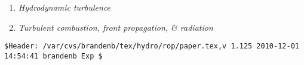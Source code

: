 \documentclass[12pt]{article}
\begin{document}
\begin{enumerate}
\begin{enumerate}
\item
{\em Hydrodynamic turbulence} \citep{
2012AN....333..195B,%
2011IAUS..274..373S,%
2011A&A...528A.145D,%
2011RPPh...74d6901B,%
2010arXiv1009.0147D,%
2006PhFl...18g5106H,%
2004physics...4118B,%
2004PhRvE..70e6301P,%
2004PhRvE..70b6405H%
}

\item
{\em Turbulent combustion, front propagation, \& radiation} \citep{
2013MNRAS.434.3526C,%
2013arXiv1308.1660B,%
2011arXiv1110.1163T,%
2011PhRvE..83a6304B,%
2011JCoPh.230....1B%
}

\end{enumerate}

\end{enumerate}

\def\nat    {Nature}
\def\apss   {Astrophys. Space Sci.}
\def\araa   {Ann.\ Rev.\ Astron.\ Astrophys.}
\def\prd    {Phys.\ Rev.\ D}
\def\pre    {Phys.\ Rev.\ E}
\def\apj    {Astrophys.\ J.}
\def\apjl   {Astrophys.\ J.\ Lett.}
\def\apjs   {Astrophys.\ J.\ Supp.}
\def\mnras  {Month.\ Not.\ Roy.\ Astron.\ Soc.}
\def\physrep{Phys.\ Rep.}
\def\aap    {Astron.\ Astrophys.}
\def\jgr    {J.\ Geophys.\ Res.}
\def\grl    {Geophys.\ Res.\ Lett.}
\def\solphys{Sol.\ Phys.}
\def\ssr    {Space Sci.\ Ref.}
\def\memsai {Mem.\ Soc.\ Astr.\ Ital.}
\def\physscr{Phys.\ Scr.}



\vfill\bigskip\noindent\tiny\begin{verbatim}
$Header: /var/cvs/brandenb/tex/hydro/rop/paper.tex,v 1.125 2010-12-01 14:54:41 brandenb Exp $
\end{verbatim}
\end{document}
